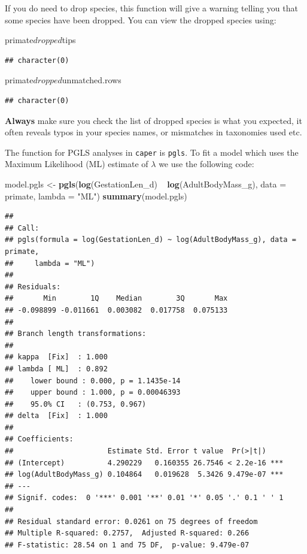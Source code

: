 \documentclass[]{book}
\newenvironment{Shaded}{\begin{snugshade}}{\end{snugshade}}
\newcommand{\KeywordTok}[1]{\textcolor[rgb]{0.13,0.29,0.53}{\textbf{{#1}}}}
\newcommand{\DataTypeTok}[1]{\textcolor[rgb]{0.13,0.29,0.53}{{#1}}}
\newcommand{\StringTok}[1]{\textcolor[rgb]{0.31,0.60,0.02}{{#1}}}
\newcommand{\NormalTok}[1]{{#1}}
\begin{document}
If you do need to drop species, this function will give a warning
telling you that some species have been dropped. You can view the
dropped species using:

\begin{Shaded}
\begin{Highlighting}[]
\NormalTok{primate$dropped$tips}
\end{Highlighting}
\end{Shaded}

\begin{verbatim}
## character(0)
\end{verbatim}

\begin{Shaded}
\begin{Highlighting}[]
\NormalTok{primate$dropped$unmatched.rows}
\end{Highlighting}
\end{Shaded}

\begin{verbatim}
## character(0)
\end{verbatim}

\textbf{Always} make sure you check the list of dropped species is what
you expected, it often reveals typos in your species names, or
mismatches in taxonomies used etc.

The function for PGLS analyses in \texttt{caper} is \texttt{pgls}. To
fit a model which uses the Maximum Likelihood (ML) estimate of
\(\lambda\) we use the following code:

\begin{Shaded}
\begin{Highlighting}[]
\NormalTok{model.pgls <-}\StringTok{ }\KeywordTok{pgls}\NormalTok{(}\KeywordTok{log}\NormalTok{(GestationLen_d) ~}\StringTok{ }\KeywordTok{log}\NormalTok{(AdultBodyMass_g), }\DataTypeTok{data =} \NormalTok{primate, }\DataTypeTok{lambda =} \StringTok{"ML"}\NormalTok{)}
\KeywordTok{summary}\NormalTok{(model.pgls)}
\end{Highlighting}
\end{Shaded}

\begin{verbatim}
## 
## Call:
## pgls(formula = log(GestationLen_d) ~ log(AdultBodyMass_g), data = primate, 
##     lambda = "ML")
## 
## Residuals:
##       Min        1Q    Median        3Q       Max 
## -0.098899 -0.011661  0.003082  0.017758  0.075133 
## 
## Branch length transformations:
## 
## kappa  [Fix]  : 1.000
## lambda [ ML]  : 0.892
##    lower bound : 0.000, p = 1.1435e-14
##    upper bound : 1.000, p = 0.00046393
##    95.0% CI   : (0.753, 0.967)
## delta  [Fix]  : 1.000
## 
## Coefficients:
##                      Estimate Std. Error t value  Pr(>|t|)    
## (Intercept)          4.290229   0.160355 26.7546 < 2.2e-16 ***
## log(AdultBodyMass_g) 0.104864   0.019628  5.3426 9.479e-07 ***
## ---
## Signif. codes:  0 '***' 0.001 '**' 0.01 '*' 0.05 '.' 0.1 ' ' 1
## 
## Residual standard error: 0.0261 on 75 degrees of freedom
## Multiple R-squared: 0.2757,  Adjusted R-squared: 0.266 
## F-statistic: 28.54 on 1 and 75 DF,  p-value: 9.479e-07
\end{verbatim}
\end{document}
